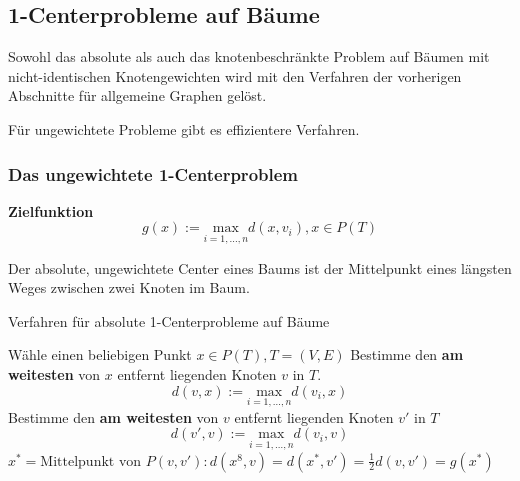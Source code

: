     \subsection{1-Centerprobleme auf Bäume} %
    \label{sub:1_centerprobleme_auf_b_ume}
      
      \par Sowohl das absolute als auch das knotenbeschränkte Problem auf Bäumen mit nicht-identischen Knotengewichten wird mit den Verfahren der vorherigen Abschnitte für allgemeine Graphen gelöst.
      
      \par Für ungewichtete Probleme gibt es effizientere Verfahren.

      \subsubsection{Das ungewichtete 1-Centerproblem} %
      \label{ssub:das_ungewichtete_1_centerproblem}

      \par \textbf{Zielfunktion}
      \[
        g(x) := \underset{i=1,\dots, n}{\text{max}}d(x, v_i), x \in P(T)
      \]

      Der absolute, ungewichtete Center eines Baums ist der Mittelpunkt eines längsten Weges zwischen zwei Knoten im Baum.

      \begin{algorithm}[H]
        \begin{algorithmic}[1]
          \caption{Verfahren für absolute 1-Centerprobleme auf Bäume}
          \State Wähle einen beliebigen Punkt $x \in P(T), T = (V, E)$
          \State Bestimme den \textbf{am weitesten} von $x$ entfernt liegenden Knoten $v$ in $T$.
          \[d(v,x):= \underset{i=1, \dots, n}{\text{max}}d(v_i, x)\]
          \State Bestimme den \textbf{am weitesten} von $v$ entfernt liegenden Knoten $v'$ in $T$
          \[d(v', v) := \underset{i = 1, \dots, n}{\text{max}}d(v_i, v)\]
          \State $x^* = \text{Mittelpunkt von } P(v, v'): d(x^8, v) = d(x^*, v') = \frac{1}{2}d(v, v') = g(x^*)$
        \end{algorithmic}
      \end{algorithm}

      \begin{exmp}
        
      \end{exmp}

